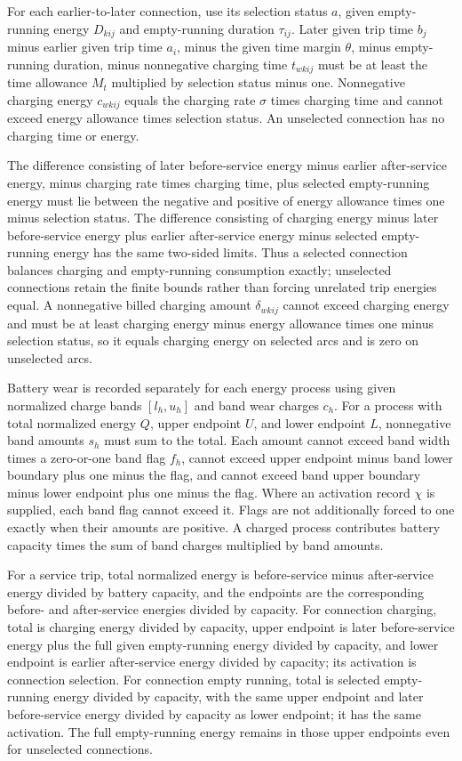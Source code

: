\documentclass[10pt]{article}
\begin{document}
For each earlier-to-later connection, use its selection status $a$, given empty-running energy $D_{kij}$ and empty-running duration $\tau_{ij}$. Later given trip time $b_j$ minus earlier given trip time $a_i$, minus the given time margin $\theta$, minus empty-running duration, minus nonnegative charging time $t_{wkij}$ must be at least the time allowance $M_t$ multiplied by selection status minus one. Nonnegative charging energy $c_{wkij}$ equals the charging rate $\sigma$ times charging time and cannot exceed energy allowance times selection status. An unselected connection has no charging time or energy.

The difference consisting of later before-service energy minus earlier after-service energy, minus charging rate times charging time, plus selected empty-running energy must lie between the negative and positive of energy allowance times one minus selection status. The difference consisting of charging energy minus later before-service energy plus earlier after-service energy minus selected empty-running energy has the same two-sided limits. Thus a selected connection balances charging and empty-running consumption exactly; unselected connections retain the finite bounds rather than forcing unrelated trip energies equal. A nonnegative billed charging amount $\delta_{wkij}$ cannot exceed charging energy and must be at least charging energy minus energy allowance times one minus selection status, so it equals charging energy on selected arcs and is zero on unselected arcs.

Battery wear is recorded separately for each energy process using given normalized charge bands $[l_h,u_h]$ and band wear charges $c_h$. For a process with total normalized energy $Q$, upper endpoint $U$, and lower endpoint $L$, nonnegative band amounts $s_h$ must sum to the total. Each amount cannot exceed band width times a zero-or-one band flag $f_h$, cannot exceed upper endpoint minus band lower boundary plus one minus the flag, and cannot exceed band upper boundary minus lower endpoint plus one minus the flag. Where an activation record $\chi$ is supplied, each band flag cannot exceed it. Flags are not additionally forced to one exactly when their amounts are positive. A charged process contributes battery capacity times the sum of band charges multiplied by band amounts.

For a service trip, total normalized energy is before-service minus after-service energy divided by battery capacity, and the endpoints are the corresponding before- and after-service energies divided by capacity. For connection charging, total is charging energy divided by capacity, upper endpoint is later before-service energy plus the full given empty-running energy divided by capacity, and lower endpoint is earlier after-service energy divided by capacity; its activation is connection selection. For connection empty running, total is selected empty-running energy divided by capacity, with the same upper endpoint and later before-service energy divided by capacity as lower endpoint; it has the same activation. The full empty-running energy remains in those upper endpoints even for unselected connections.
\end{document}
